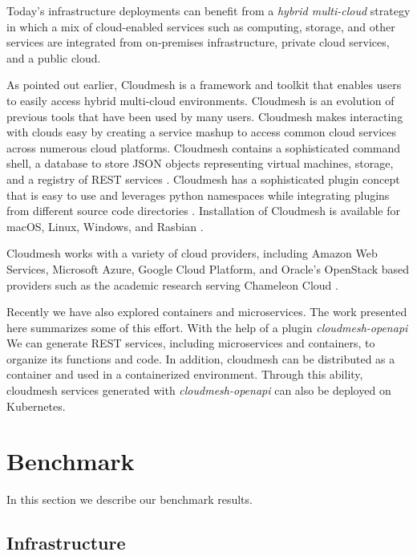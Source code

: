 Today's infrastructure deployments can benefit from a {\em hybrid multi-cloud}
strategy in which a mix of cloud-enabled services such as computing, storage, and other services 
are integrated from on-premises infrastructure, private cloud services, and a public cloud.

As pointed out earlier, Cloudmesh \cite{cloudmesh-manual} is a framework and toolkit that enables users to
easily access hybrid multi-cloud environments. Cloudmesh is an evolution of
previous tools that have been used by many users. Cloudmesh makes
interacting with clouds easy by creating a service mashup to access
common cloud services across numerous cloud platforms. Cloudmesh
contains a sophisticated command shell, a database to store JSON
objects representing virtual machines, storage, and a registry of REST
services \cite{cloudmesh-openapi}.  Cloudmesh has a sophisticated
plugin concept that is easy to use and leverages python namespaces
while integrating plugins from different source code
directories \cite{cloudmesh-github}.  Installation of Cloudmesh is
available for macOS, Linux, Windows, and Rasbian
\cite{cloudmesh-manual}.

Cloudmesh works with a variety of cloud providers, including Amazon Web
Services, Microsoft Azure, Google Cloud Platform, and Oracle's OpenStack
based providers such as the academic research serving Chameleon Cloud \cite{chameleon-cloud}.

Recently we have also explored containers and microservices. The work presented here summarizes some of this effort. With the help of a plugin {\em cloudmesh-openapi} We can generate REST services, including microservices and
containers, to organize its functions and code. In addition, cloudmesh can be distributed as a container and used in a containerized environment. Through this ability, cloudmesh services generated with {\em cloudmesh-openapi} can also be deployed on Kubernetes.








\section{Benchmark}
\label{sec:benchmark}

In this section we describe our benchmark results.

\subsection{Infrastructure}

